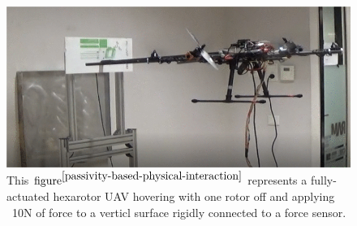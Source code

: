 \begin{figure}[H]
	\includegraphics[width=0.95\columnwidth]{figure/passivity-based-interaction.png}	
	\centering
	\caption{This $\text{figure}^{\cite{passivity-based-physical-interaction}}$ represents a fully-actuated hexarotor UAV hovering with one rotor off and applying ~10N of force to a verticl surface rigidly connected to a force sensor.}
	\label{fig:aerial_compliance}
\end{figure}

\cite{door-opening}

 \cite{ref:corosion-inspection}\cite{ref:inspection-overview}\cite{Ollero2018} \cite{ref:sar}  \cite{ref:lidar-equipped-model-building}

\cite{passivity-based-crop} 
\cite{cooperative-control-quadrotor}
\cite{haptic-teleoperation-uav}